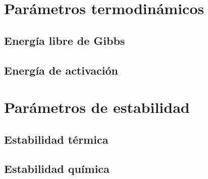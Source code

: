 


\section{Parámetros termodinámicos}



\subsection{Energía libre de Gibbs}



\subsection{Energía de activación}



\section{Parámetros de estabilidad}



\subsection{Estabilidad térmica}



\subsection{Estabilidad química}




